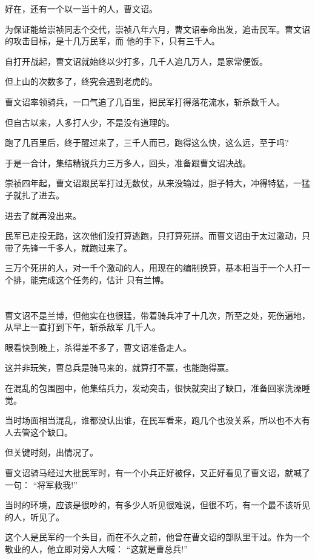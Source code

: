 \documentclass[11pt,a4paper,onecolumn]{article}
\begin{document}
好在，还有一个以一当十的人，曹文诏。

为保证能给崇祯同志个交代，崇祯八年六月，曹文诏奉命出发，追击民军。曹文诏的攻击目标，是十几万民军，而
他的手下，只有三千人。

自打开战起，曹文诏就始终以少打多，几千人追几万人，是家常便饭。

但上山的次数多了，终究会遇到老虎的。

曹文诏率领骑兵，一口气追了几百里，把民军打得落花流水，斩杀数千人。

但自古以来，人多打人少，不是没有道理的。

跑了几百里后，终于醒过来了，三千人而已，跑得这么快，这么远，至于吗?

于是一合计，集结精锐兵力三万多人，回头，准备跟曹文诏决战。

崇祯四年起，曹文诏跟民军打过无数仗，从来没输过，胆子特大，冲得特猛，一猛子就扎了进去。

进去了就再没出来。

民军已走投无路，这次他们没打算逃跑，只打算死拼。而曹文诏由于太过激动，只带了先锋一千多人，就跑过来了。

三万个死拼的人，对一千个激动的人，用现在的编制换算，基本相当于一个人打一个排，能完成这个任务的，估计
只有兰博。

\section[\thesection]{}

曹文诏不是兰博，但他实在也很猛，带着骑兵冲了十几次，所至之处，死伤遍地，从早上一直打到下午，斩杀敌军
几千人。

眼看快到晚上，杀得差不多了，曹文诏准备走人。

这并非玩笑，曹总兵是骑马来的，就算打不赢，也能跑得赢。

在混乱的包围圈中，他集结兵力，发动突击，很快就突出了缺口，准备回家洗澡睡觉。

当时场面相当混乱，谁都没认出谁，在民军看来，跑几个也没关系，所以也不大有人去管这个缺口。

但关键时刻，出情况了。

曹文诏骑马经过大批民军时，有一个小兵正好被俘，又正好看见了曹文诏，就喊了一句： ``将军救我!''

当时的环境，应该是很吵的，有多少人听见很难说，但很不巧，有一个最不该听见的人，听见了。

这个人是民军的一个头目，而在不久之前，他曾在曹文诏的部队里干过。作为一个敬业的人，他立即对旁人大喊：
``这就是曹总兵!''
\end{document}
